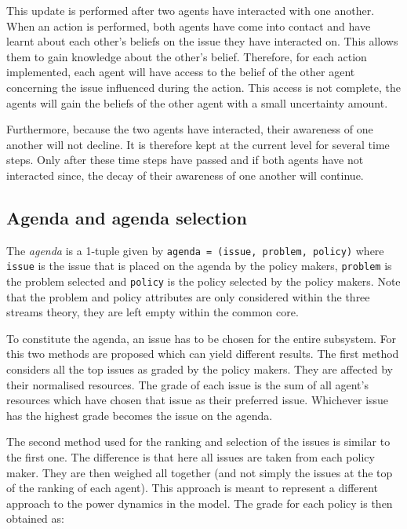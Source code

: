 This update is performed after two agents have interacted with one another. When an action is performed, both agents have come into contact and have learnt about each other’s beliefs on the issue they have interacted on. This allows them to gain knowledge about the other’s belief. Therefore, for each action implemented, each agent will have access to the belief of the other agent concerning the issue influenced during the action. This access is not complete, the agents will gain the beliefs of the other agent with a small uncertainty amount.

Furthermore, because the two agents have interacted, their awareness of one another will not decline. It is therefore kept at the current level for several time steps. Only after these time steps have passed and if both agents have not interacted since, the decay of their awareness of one another will continue.

\subsection{Agenda and agenda selection}

The \emph{agenda} is a 1-tuple given by \texttt{agenda = (issue, problem, policy)} where \texttt{issue} is the issue that is placed on the agenda by the policy makers, \texttt{problem} is the problem selected and \texttt{policy} is the policy selected by the policy makers. Note that the problem and policy attributes are only considered within the three streams theory, they are left empty within the common core.


To constitute the agenda, an issue has to be chosen for the entire subsystem. For this two methods are proposed which can yield different results. The first method considers all the top issues as graded by the policy makers. They are affected by their normalised resources. The grade of each issue is the sum of all agent's resources which have chosen that issue as their preferred issue. Whichever issue has the highest grade becomes the issue on the agenda.

The second method used for the ranking and selection of the issues is similar to the first one. The difference is that here all issues are taken from each policy maker. They are then weighed all together (and not simply the issues at the top of the ranking of each agent). This approach is meant to represent a different approach to the power dynamics in the model. The grade for each policy is then obtained as:

